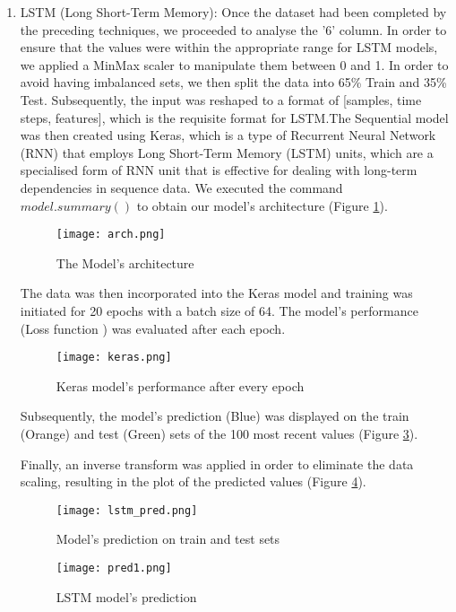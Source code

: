 \documentclass[10pt]{article}
\begin{document}
\begin{multicols}{2}
\begin{enumerate}
\item LSTM (Long Short-Term Memory): Once the dataset had been completed by the preceding techniques, we proceeded to analyse the '6' column.\newline
In order to ensure that the values were within the appropriate range for LSTM models, we applied a MinMax scaler to manipulate them between 0 and 1. In order to avoid having imbalanced sets, we then split the data into 65\% Train and 35\% Test.
Subsequently, the input was reshaped to a format of [samples, time steps, features], which is the requisite format for LSTM.\newline The Sequential model was then created using Keras, which is a type of Recurrent Neural Network (RNN) that employs Long Short-Term Memory (LSTM) units, which are a specialised form of RNN unit that is effective for dealing with long-term dependencies in sequence data.\newline
We executed the command $model.summary()$ to obtain our model's architecture (Figure \ref{f15}).

\begin{figure}[H]
\centering
\texttt{[image: arch.png]}
\caption{The Model's architecture}
\label{f15}
\end{figure}
The data was then incorporated into the Keras model and training was initiated for 20 epochs with a batch size of 64.\newline
The model's performance (Loss function \cite{c11}) was evaluated after each epoch.

\begin{figure}[H]
\centering
\texttt{[image: keras.png]}
\caption{Keras model's performance after every epoch }
\label{f16}
\end{figure}

Subsequently, the model's prediction (Blue) was displayed on the train (Orange) and test (Green) sets of the 100 most recent values (Figure \ref{f17}).

Finally, an inverse transform was applied in order to eliminate the data scaling, resulting in the plot of the predicted values (Figure \ref{f18}).

\begin{figure}[H]
\centering
\texttt{[image: lstm\_pred.png]}
\caption{Model's prediction on train and test sets}
\label{f17}
\end{figure}


\begin{figure}[H]
\centering
\texttt{[image: pred1.png]}
\caption{LSTM model's prediction }
\label{f18}
\end{figure}


\end{enumerate}
\end{multicols}
\end{document}
